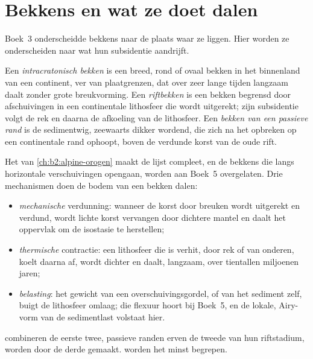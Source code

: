 \section{Bekkens en wat ze doet dalen}\label{sec:b2:basins-compared:types}

Boek~3 onderscheidde bekkens naar de plaats waar ze liggen. Hier worden ze onderscheiden naar wat
hun subsidentie aandrijft.

\begin{definition}\label{def:b2:basins-compared:types}
Een \emph{intracratonisch bekken} is een breed, rond of ovaal bekken in het
binnenland van een continent, ver van plaatgrenzen, dat over zeer lange tijden langzaam daalt
zonder grote breukvorming. Een \emph{riftbekken} is een bekken begrensd door afschuivingen
in een continentale lithosfeer die wordt uitgerekt; zijn subsidentie volgt de rek en daarna
de afkoeling van de lithosfeer. Een \emph{bekken van een passieve rand} is de
sedimentwig, zeewaarts dikker wordend, die zich na het opbreken op een continentale rand ophoopt,
boven de verdunde korst van de oude rift.
\end{definition}

Het  van \cref{ch:b2:alpine-orogen} maakt de lijst compleet, en de bekkens die
langs horizontale verschuivingen opengaan, worden aan Boek~5 overgelaten. Drie mechanismen doen de bodem van een
bekken dalen:
\begin{itemize}
  \item \emph{mechanische} verdunning: wanneer de korst door breuken wordt uitgerekt en verdund, wordt lichte
        korst vervangen door dichtere mantel en daalt het oppervlak om de isostasie te herstellen;
  \item \emph{thermische} contractie: een lithosfeer die is verhit, door rek of van
        onderen, koelt daarna af, wordt dichter en daalt, langzaam, over tientallen miljoenen jaren;
  \item \emph{belasting}: het gewicht van een overschuivingsgordel, of van het sediment zelf, buigt de
        lithosfeer omlaag; die flexuur hoort bij Boek~5, en de lokale, Airy-vorm van
        de sedimentlast volstaat hier.
\end{itemize}
 combineren de eerste twee, passieve randen erven de tweede van hun riftstadium,
 worden door de derde gemaakt.  worden het minst begrepen.


